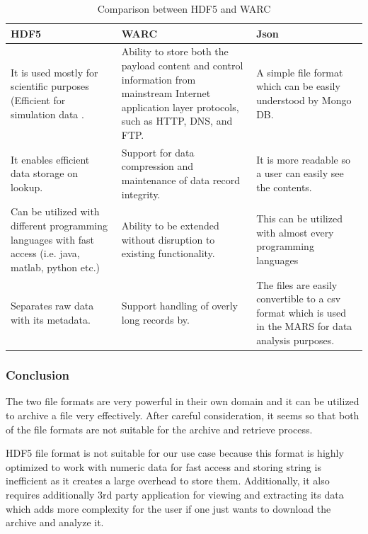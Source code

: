  \begin{table}[H]
    \centering
    \begin{tabular}{|p{5cm}|p{5cm}|p{5cm}|}
        \hline
            \textbf{HDF5}  & \textbf{WARC}&\textbf{Json}\\
        \hline
            It is used mostly for scientific purposes (Efficient
            for simulation data \cite[p.~11]{Savic2007}. & 
            Ability to store both the payload content and control information from mainstream Internet application layer protocols, such as
            HTTP, DNS, and FTP. & A simple file format which can be easily understood by Mongo DB.\\
        \hline
            It enables efficient data storage on lookup.
            &  
            Support for data compression and maintenance of
             data record integrity. & It is more readable so a user can easily see the contents.\\
        \hline
        Can be utilized with different programming languages with fast access (i.e. java, matlab, python etc.) &  
                Ability to be extended without disruption
                to existing functionality. & This can be utilized with almost every programming languages\\
        \hline
        Separates raw data with its metadata. & Support handling of overly long records by.& The files are easily convertible to a csv format which is used in the MARS
        for data analysis purposes. \\        
        \hline
    \end{tabular}
    \caption{Comparison between HDF5 and WARC}
    \label{table:Hdf5vsWARC}     
\end{table} 

\subsubsection{Conclusion}
    The two file formats are very powerful in their own domain and it can be utilized to archive a file very effectively. After careful consideration,  
    it seems so that both of the file formats are not suitable for the archive and retrieve process. 

    HDF5 file format is not suitable for our use case because this format is highly optimized to work with
    numeric data for fast access and storing string is inefficient as it creates a large overhead to store them. 
    Additionally, it also requires additionally 3rd party application for viewing and extracting its data which 
    adds more complexity for the user if one just wants to download the archive and analyze it. 

